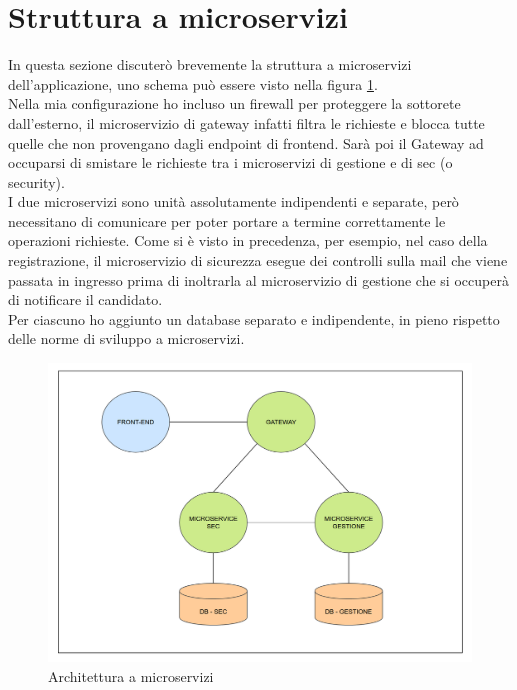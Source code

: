 \section{Struttura a microservizi}
In questa sezione discuterò brevemente la struttura a microservizi dell'applicazione, uno schema può essere visto nella figura \ref{fig:microservices}.
\\
Nella mia configurazione ho incluso un firewall per proteggere la sottorete dall'esterno, il microservizio di gateway infatti filtra le richieste e blocca tutte quelle che non provengano dagli endpoint di frontend. Sarà poi il Gateway ad occuparsi di smistare le richieste tra i microservizi di gestione e di sec (o security).
\\
I due microservizi sono unità assolutamente indipendenti e separate, però necessitano di comunicare per poter portare a termine correttamente le operazioni richieste. Come si è visto in precedenza, per esempio, nel caso della registrazione, il microservizio di sicurezza esegue dei controlli sulla mail che viene passata in ingresso prima di inoltrarla al microservizio di gestione che si occuperà di notificare il candidato.
\\
Per ciascuno ho aggiunto un database separato e indipendente, in pieno rispetto delle norme di sviluppo a microservizi.

\begin{center}
    \begin{figure}[h]
        \includegraphics[width=450px]{./images/architettura.png}
        \caption{Architettura a microservizi}
        \label{fig:microservices}
    \end{figure}
\end{center}



